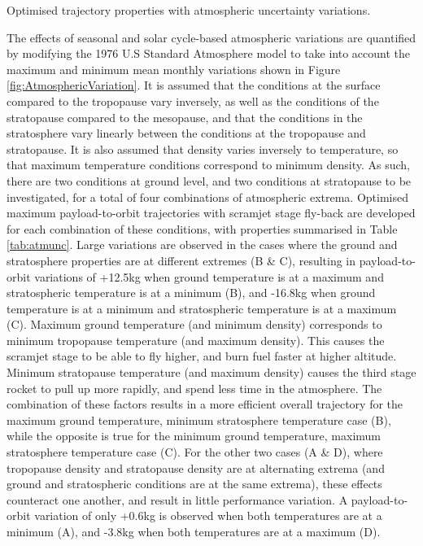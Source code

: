 \begin{table}[ht]
	\caption{Optimised trajectory properties with atmospheric uncertainty variations.}
		\label{tab:atmunc}
	
\end{table}



The effects of seasonal and solar cycle-based atmospheric variations are quantified by modifying the 1976 U.S Standard Atmosphere model to take into account the maximum and minimum mean monthly variations shown in Figure \ref{fig:AtmosphericVariation}. It is assumed that the conditions at the surface compared to the tropopause vary inversely, as well as the conditions of the stratopause compared to the mesopause, and that the conditions in the stratosphere vary linearly between the conditions at the tropopause and stratopause. It is also assumed that density varies inversely to temperature, so that maximum temperature conditions correspond to minimum density. As such, there are two conditions at ground level, and two conditions at stratopause to be investigated, for a total of four combinations of atmospheric extrema. Optimised maximum payload-to-orbit trajectories with scramjet stage fly-back are developed for each combination of these conditions, with properties summarised in Table \ref{tab:atmunc}. Large variations are observed in the cases where the ground and stratosphere properties are at different extremes (B \& C), resulting in payload-to-orbit variations of +12.5kg when ground temperature is at a maximum and stratospheric temperature is at a minimum (B), and -16.8kg when ground temperature is at a minimum and stratospheric temperature is at a maximum (C). Maximum ground temperature (and minimum density) corresponds to minimum tropopause temperature (and maximum density). This causes the scramjet stage to be able to fly higher, and burn fuel faster at higher altitude. Minimum stratopause temperature (and maximum density) causes the third stage rocket to pull up more rapidly, and spend less time in the atmosphere. The combination of these factors results in a more efficient overall trajectory for the maximum ground temperature, minimum stratosphere temperature case (B), while the opposite is true for the minimum ground temperature, maximum stratosphere temperature case (C). For the other two cases (A \& D), where tropopause density and stratopause density are at alternating extrema (and ground and stratospheric conditions are at the same extrema), these effects counteract one another, and result in little performance variation. A payload-to-orbit variation of only +0.6kg is observed when both temperatures are at a minimum (A), and -3.8kg when both temperatures are at a maximum (D).

